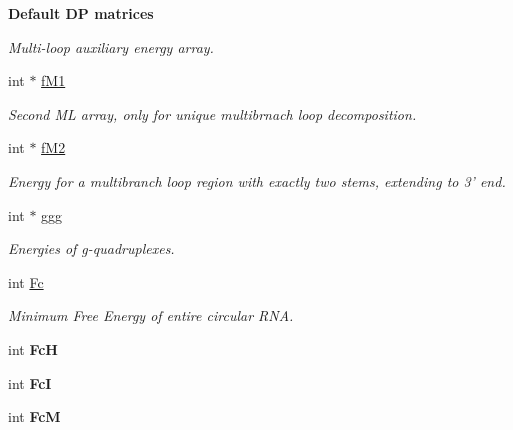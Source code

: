 \begin{Indent}{\bf Default D\+P matrices}
\begin{DoxyCompactItemize}
\begin{DoxyCompactList}\small\item\em Multi-\/loop auxiliary energy array. \end{DoxyCompactList}\item 
\hypertarget{group__dp__matrices_ae4e598d601f5ece6b8b4ffffcae2db06}{int $\ast$ \hyperlink{group__dp__matrices_ae4e598d601f5ece6b8b4ffffcae2db06}{f\+M1}}\label{group__dp__matrices_ae4e598d601f5ece6b8b4ffffcae2db06}

\begin{DoxyCompactList}\small\item\em Second M\+L array, only for unique multibrnach loop decomposition. \end{DoxyCompactList}\item 
\hypertarget{group__dp__matrices_ad29106e37d485b3f20b7be468e6c179c}{int $\ast$ \hyperlink{group__dp__matrices_ad29106e37d485b3f20b7be468e6c179c}{f\+M2}}\label{group__dp__matrices_ad29106e37d485b3f20b7be468e6c179c}

\begin{DoxyCompactList}\small\item\em Energy for a multibranch loop region with exactly two stems, extending to 3' end. \end{DoxyCompactList}\item 
\hypertarget{group__dp__matrices_a0b7b86a5c75c96eabb89eb53a13e7164}{int $\ast$ \hyperlink{group__dp__matrices_a0b7b86a5c75c96eabb89eb53a13e7164}{ggg}}\label{group__dp__matrices_a0b7b86a5c75c96eabb89eb53a13e7164}

\begin{DoxyCompactList}\small\item\em Energies of g-\/quadruplexes. \end{DoxyCompactList}\item 
\hypertarget{group__dp__matrices_ac6a22d71c6a0eccedf978372b19b458a}{int \hyperlink{group__dp__matrices_ac6a22d71c6a0eccedf978372b19b458a}{Fc}}\label{group__dp__matrices_ac6a22d71c6a0eccedf978372b19b458a}

\begin{DoxyCompactList}\small\item\em Minimum Free Energy of entire circular R\+N\+A. \end{DoxyCompactList}\item 
\hypertarget{group__dp__matrices_a1ba03c53ee2a32eaf8b46c0eb259e0c4}{int {\bfseries Fc\+H}}\label{group__dp__matrices_a1ba03c53ee2a32eaf8b46c0eb259e0c4}

\item 
\hypertarget{group__dp__matrices_a96ac173770c9745a30823fa17fe0b7f4}{int {\bfseries Fc\+I}}\label{group__dp__matrices_a96ac173770c9745a30823fa17fe0b7f4}

\item 
\hypertarget{group__dp__matrices_a9a4bf70926f79372388eccc7e73759e9}{int {\bfseries Fc\+M}}\label{group__dp__matrices_a9a4bf70926f79372388eccc7e73759e9}

\end{DoxyCompactItemize}
\end{Indent}
